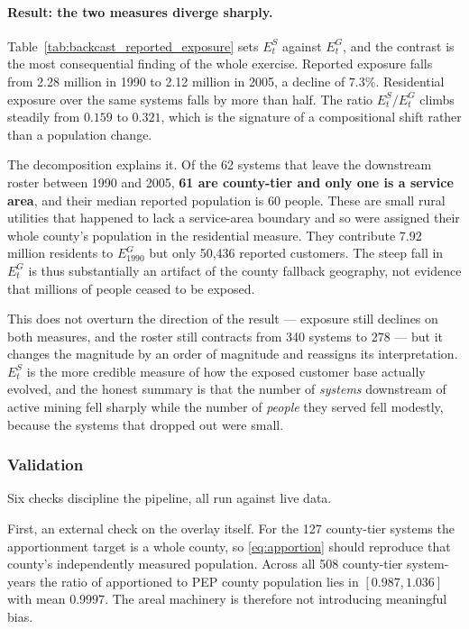 \paragraph{Result: the two measures diverge sharply.}
Table~\ref{tab:backcast_reported_exposure} sets $E^{S}_t$ against $E^{G}_t$, and
the contrast is the most consequential finding of the whole exercise. Reported
exposure falls from 2.28 million in 1990 to 2.12 million in 2005, a decline of
$7.3$\%. Residential exposure over the same systems falls by more than half. The
ratio $E^{S}_t/E^{G}_t$ climbs steadily from $0.159$ to $0.321$, which is the
signature of a compositional shift rather than a population change.

The decomposition explains it. Of the 62 systems that leave the downstream roster
between 1990 and 2005, \textbf{61 are county-tier and only one is a service
area}, and their median reported population is 60 people. These are small rural
utilities that happened to lack a service-area boundary and so were assigned
their whole county's population in the residential measure. They contribute 7.92
million residents to $E^{G}_{1990}$ but only 50,436 reported customers. The steep
fall in $E^{G}_t$ is thus substantially an artifact of the county fallback
geography, not evidence that millions of people ceased to be exposed.

This does not overturn the direction of the result --- exposure still declines on
both measures, and the roster still contracts from 340 systems to 278 --- but it
changes the magnitude by an order of magnitude and reassigns its interpretation.
$E^{S}_t$ is the more credible measure of how the exposed customer base actually
evolved, and the honest summary is that the number of \emph{systems} downstream
of active mining fell sharply while the number of \emph{people} they served fell
modestly, because the systems that dropped out were small.



\subsubsection{Validation}

Six checks discipline the pipeline, all run against live data.

First, an external check on the overlay itself. For the 127 county-tier systems
the apportionment target is a whole county, so \eqref{eq:apportion} should
reproduce that county's independently measured population. Across all 508
county-tier system-years the ratio of apportioned to PEP county population lies
in $[0.987,1.036]$ with mean $0.9997$. The areal machinery is therefore not
introducing meaningful bias.

